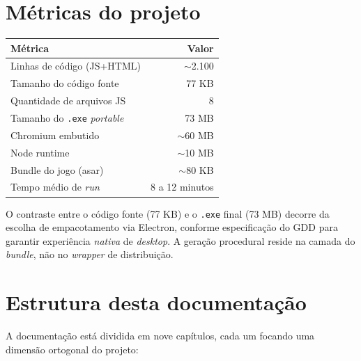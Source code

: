 \section{Métricas do projeto}

\begin{tabular}{lr}
  \toprule
  \textbf{Métrica} & \textbf{Valor} \\
  \midrule
  Linhas de código (JS+HTML) & $\sim$2.100 \\
  Tamanho do código fonte & 77 KB \\
  Quantidade de arquivos JS & 8 \\
  Tamanho do \texttt{.exe} \textit{portable} & 73 MB \\
  \quad Chromium embutido & $\sim$60 MB \\
  \quad Node runtime & $\sim$10 MB \\
  \quad Bundle do jogo (asar) & $\sim$80 KB \\
  Tempo médio de \emph{run} & 8 a 12 minutos \\
  \bottomrule
\end{tabular}

O contraste entre o código fonte (77 KB) e o \texttt{.exe} final (73 MB) decorre da
escolha de empacotamento via Electron, conforme especificação do GDD para garantir
experiência \emph{nativa} de \textit{desktop}. A geração procedural reside na camada do
\emph{bundle}, não no \emph{wrapper} de distribuição.

\section{Estrutura desta documentação}

A documentação está dividida em nove capítulos, cada um focando uma dimensão ortogonal
do projeto:

